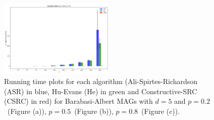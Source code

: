 \documentclass[a4paper]{article}
\begin{document}
\begin{figure}[htbp]
	\centering
	\hfill
	
	\includegraphics[width=0.49\textwidth]{figures/Figure_24.png}
	
	\caption{Running time plots for each algorithm (Ali-Spirtes-Richardson (ASR) in blue, Hu-Evans (He) in green and Constructive-SRC (CSRC) in red) for Barabasi-Albert MAGs with $d=5$ and $p=0.2$~(Figure (a)), $p=0.5$~(Figure (b)), $p=0.8$~(Figure (c)).}
	\label{fig:sf-5-ap}
\end{figure}
\end{document}
